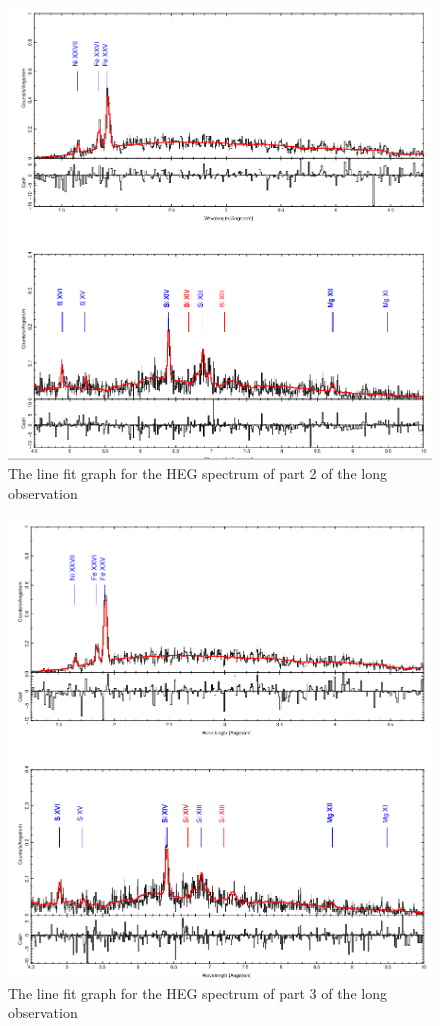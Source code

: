 \begin{figure}[h!]
    \centering
    \includegraphics[width=\linewidth]{Chapters/Figures/part2_heg.png}
    \caption{The line fit graph for the HEG spectrum of part 2 of the long observation}
    \label{fig:part2}
\end{figure}

\begin{figure}[h!]
    \centering
    \includegraphics[width=\linewidth]{Chapters/Figures/part3_heg.png}
    \caption{The line fit graph for the HEG spectrum of part 3 of the long observation}
    \label{fig:part3}
\end{figure}


